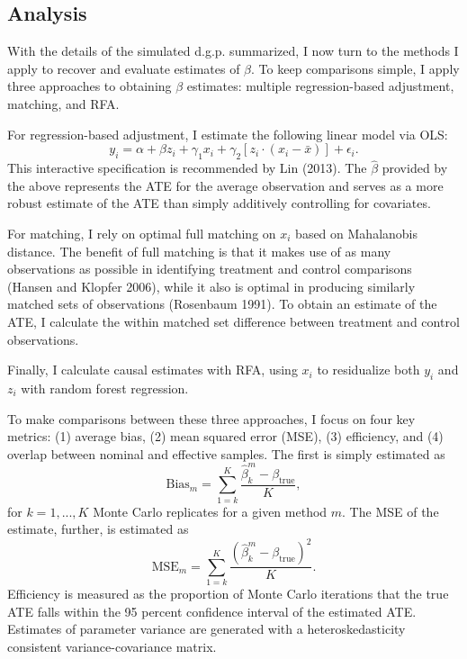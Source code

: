\documentclass[11pt,]{article}
\begin{document}
\hypertarget{analysis}{%
\subsection{Analysis}\label{analysis}}

With the details of the simulated d.g.p. summarized, I now turn to the
methods I apply to recover and evaluate estimates of \(\beta\). To keep
comparisons simple, I apply three approaches to obtaining \(\beta\)
estimates: multiple regression-based adjustment, matching, and RFA.

For regression-based adjustment, I estimate the following linear model
via OLS:
\[y_i = \alpha + \beta z_i + \gamma_1 x_i + \gamma_2[z_i\cdot(x_i - \bar{x})] + \epsilon_i.\]
This interactive specification is recommended by Lin (2013). The
\(\hat{\beta}\) provided by the above represents the ATE for the average
observation and serves as a more robust estimate of the ATE than simply
additively controlling for covariates.

For matching, I rely on optimal full matching on \(x_i\) based on
Mahalanobis distance. The benefit of full matching is that it makes use
of as many observations as possible in identifying treatment and control
comparisons (Hansen and Klopfer 2006), while it also is optimal in
producing similarly matched sets of observations (Rosenbaum 1991). To
obtain an estimate of the ATE, I calculate the within matched set
difference between treatment and control observations.

Finally, I calculate causal estimates with RFA, using \(x_i\) to
residualize both \(y_i\) and \(z_i\) with random forest regression.

To make comparisons between these three approaches, I focus on four key
metrics: (1) average bias, (2) mean squared error (MSE), (3) efficiency,
and (4) overlap between nominal and effective samples. The first is
simply estimated as
\[\text{Bias}_m = \sum_{1=k}^K\frac{\hat{\beta}^m_k - \beta_\text{true}}{K},\]
for \(k = 1,...,K\) Monte Carlo replicates for a given method \(m\). The
MSE of the estimate, further, is estimated as
\[\text{MSE}_m = \sum_{1=k}^K\frac{\left(\hat{\beta}^m_k - \beta_\text{true}\right)^2}{K}.\]
Efficiency is measured as the proportion of Monte Carlo iterations that
the true ATE falls within the 95 percent confidence interval of the
estimated ATE. Estimates of parameter variance are generated with a
heteroskedasticity consistent variance-covariance matrix.
\end{document}
